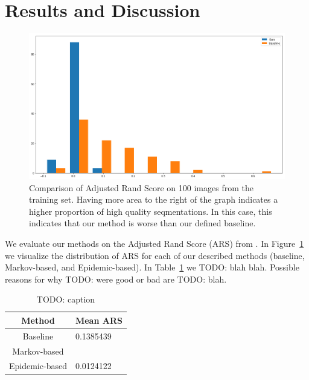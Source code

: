 \documentclass[twocolumn]{article}
\newcommand{\todo}[1]{}
\renewcommand{\todo}[1]{{\color{red} TODO: {#1}}}
\newcommand{\seclab}[1]{\label{sec:#1}}
\newcommand{\figref}[1]{Figure~\ref{fig:#1}}
\newcommand{\figlab}[1]{\label{fig:#1}}
\newcommand{\tblref}[1]{Table~\ref{tbl:#1}}
\newcommand{\tbllab}[1]{\label{tbl:#1}}
\begin{document}
\section{Results and Discussion}\seclab{results}

\begin{figure}
  \centering
  \includegraphics[width=\linewidth]{figs/bars.png}
  \caption{Comparison of Adjusted Rand Score on 100 images from the training
  set. Having more area to the right of the graph indicates a higher proportion
  of high quality seqmentations. In this case, this indicates that our method is
  worse than our defined baseline.
  }
  \figlab{bars}
\end{figure}

We evaluate our methods on the Adjusted Rand Score (ARS) from
\cite{unnikrishnan2005measure}. In \figref{bars} we visualize the distribution
of ARS for each of our described methods (baseline, Markov-based, and
Epidemic-based). In \tblref{ars} we \todo{blah blah}. Possible reasons for why
\todo{were good or bad} are \todo{blah}.

\begin{table}
    \centering
    \caption{\todo{caption}}
    \tbllab{ars}

    \begin{tabular}{c|l}
        Method & Mean ARS \\ \hline
        Baseline & 0.1385439 \\
        Markov-based & ~ \\
        Epidemic-based & 0.0124122
    \end{tabular}
\end{table}
\end{document}
